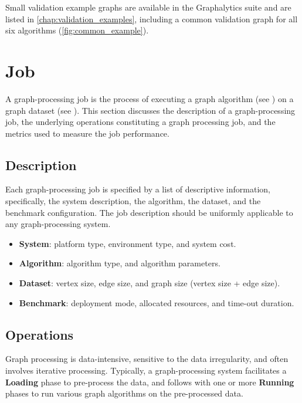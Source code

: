 Small validation example graphs are available in the Graphalytics suite and are listed in \autoref{chap:validation_examples}, including a common validation graph for all six algorithms (\autoref{fig:common_example}).











\section{Job}
\label{sec:def:job}
A graph-processing job is the process of executing a graph algorithm (see ) on a graph dataset (see ). This section discusses the description of a graph-processing job, the underlying operations constituting a graph processing job, and the metrics used to measure the job performance.

\subsection{Description}
Each graph-processing job is specified by a list of descriptive information, specifically, the system description, the algorithm, the dataset, and the benchmark configuration. The job description should be uniformly applicable to any graph-processing system.

\begin{itemize}
    \item \textbf{System}: platform type, environment type, and system cost.
    \item \textbf{Algorithm}: algorithm type, and algorithm parameters. 
    \item \textbf{Dataset}: vertex size, edge size, and graph size (vertex size + edge size).
    \item \textbf{Benchmark}: deployment mode, allocated resources, and time-out duration.
\end{itemize}


\subsection{Operations}
\label{sec:def:job:operation}
Graph processing is data-intensive, sensitive to the data irregularity, and often involves iterative processing. Typically, a graph-processing system facilitates a \textbf{Loading} phase to pre-process the data, and follows with one or more \textbf{Running} phases to run various graph algorithms on the pre-processed data.


